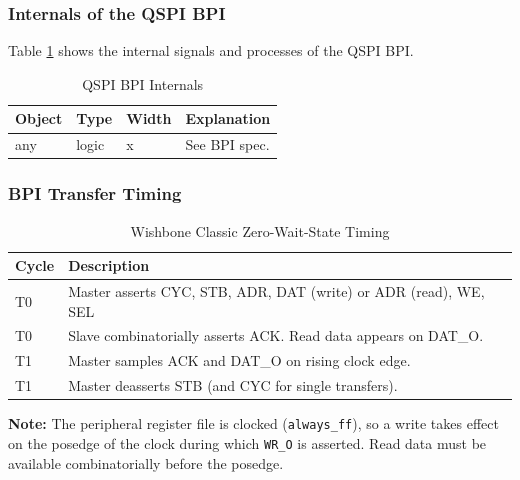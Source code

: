 \subsubsection{Internals of the QSPI BPI}
Table \ref{tab:asQspiPer07} shows the internal signals and processes of the QSPI BPI.
\begin{table}[H]
\caption{QSPI BPI Internals}
\label{tab:asQspiPer07}
\centering
\begin{tabularx}{\textwidth}{|l |l |l |X|}
  \hline
  Object & Type & Width & Explanation \\
  \hline
  \hline
  any & logic & x & See BPI spec. \\
  \hline
\end{tabularx}
\end{table}

\subsubsection{BPI Transfer Timing}

\begin{table}[H]
\caption{Wishbone Classic Zero-Wait-State Timing}
\label{tab:asbpi_timing}
\centering
\begin{tabularx}{\textwidth}{|l|X|}
  \hline
  Cycle & Description \\
  \hline\hline
  T0 & Master asserts CYC, STB, ADR, DAT (write) or ADR (read), WE, SEL \\
  \hline
  T0 & Slave combinatorially asserts ACK. Read data appears on DAT\_O. \\
  \hline
  T1 & Master samples ACK and DAT\_O on rising clock edge. \\
  \hline
  T1 & Master deasserts STB (and CYC for single transfers). \\
  \hline
\end{tabularx}
\end{table}

\textbf{Note:} The peripheral register file is clocked (\texttt{always\_ff}),
so a write takes effect on the posedge of the clock during which \texttt{WR\_O}
is asserted. Read data must be available combinatorially before the posedge.

